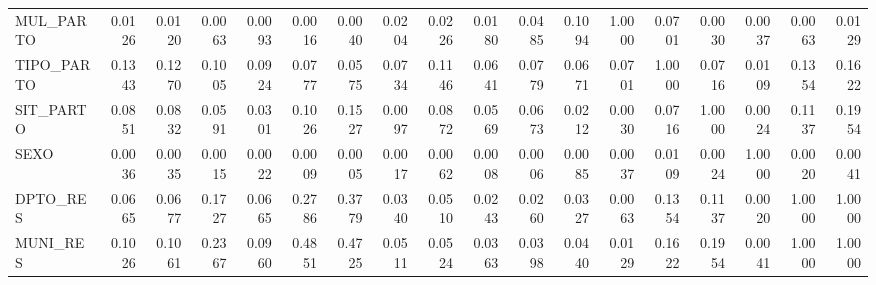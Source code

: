 \begin{tabular}{lrrrrrrrrrrrrrrrrr}
MUL\_PARTO & 0.0126 & 0.0120 & 0.0063 & 0.0093 & 0.0016 & 0.0040 & 0.0204 & 0.0226 & 0.0180 & 0.0485 & 0.1094 & 1.0000 & 0.0701 & 0.0030 & 0.0037 & 0.0063 & 0.0129 \\
TIPO\_PARTO & 0.1343 & 0.1270 & 0.1005 & 0.0924 & 0.0777 & 0.0575 & 0.0734 & 0.1146 & 0.0641 & 0.0779 & 0.0671 & 0.0701 & 1.0000 & 0.0716 & 0.0109 & 0.1354 & 0.1622 \\
SIT\_PARTO & 0.0851 & 0.0832 & 0.0591 & 0.0301 & 0.1026 & 0.1527 & 0.0097 & 0.0872 & 0.0569 & 0.0673 & 0.0212 & 0.0030 & 0.0716 & 1.0000 & 0.0024 & 0.1137 & 0.1954 \\
SEXO & 0.0036 & 0.0035 & 0.0015 & 0.0022 & 0.0009 & 0.0005 & 0.0017 & 0.0062 & 0.0008 & 0.0006 & 0.0085 & 0.0037 & 0.0109 & 0.0024 & 1.0000 & 0.0020 & 0.0041 \\
DPTO\_RES & 0.0665 & 0.0677 & 0.1727 & 0.0665 & 0.2786 & 0.3779 & 0.0340 & 0.0510 & 0.0243 & 0.0260 & 0.0327 & 0.0063 & 0.1354 & 0.1137 & 0.0020 & 1.0000 & 1.0000 \\
MUNI\_RES & 0.1026 & 0.1061 & 0.2367 & 0.0960 & 0.4851 & 0.4725 & 0.0511 & 0.0524 & 0.0363 & 0.0398 & 0.0440 & 0.0129 & 0.1622 & 0.1954 & 0.0041 & 1.0000 & 1.0000 \\
\bottomrule
\end{tabular}
